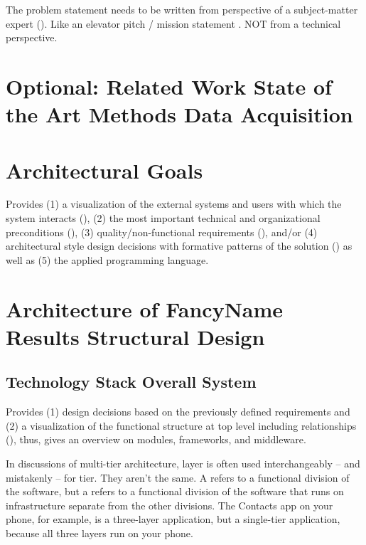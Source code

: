 \documentclass[conference,a4paper,flushend]{cs-techrep}
\begin{document}
The problem statement needs to be written from perspective of a subject-matter expert (). Like an elevator pitch / mission statement \faWarning{}. NOT from a technical perspective.

\section{Optional: Related Work \textbar{} State of the Art \textbar{} Methods \textbar{} Data Acquisition}
\lipsum[12]

\section{Architectural Goals} %
Provides
(1) a visualization of the external systems and users with which the system interacts (),
(2) the most important technical and organizational preconditions (),
(3) quality/non-functional requirements (), and/or
(4) architectural style design decisions with formative patterns of the solution ()
as well as (5) the applied programming language.

\section{Architecture of FancyName \textbar{} Results \textbar{} Structural Design \textbar{}  }

\subsection{Technology Stack \textbar{} Overall System} %
Provides
(1) design decisions based on the previously defined requirements and
(2) a visualization of the functional structure at top level including relationships (), thus, gives an overview on modules, frameworks, and middleware.

In discussions of multi-tier architecture, layer is often used interchangeably -- and mistakenly -- for tier. They aren't the same. A  refers to a functional division of the software, but a  refers to a functional division of the software that runs on infrastructure separate from the other divisions. The Contacts app on your phone, for example, is a three-layer application, but a single-tier application, because all three layers run on your phone.
\end{document}
